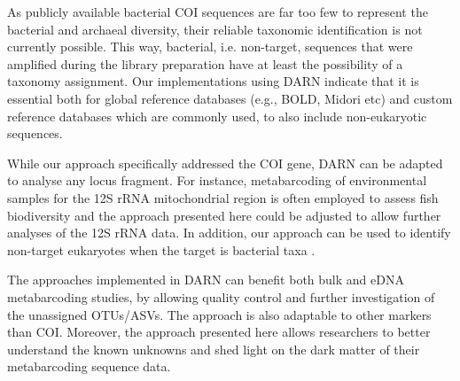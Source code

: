    As publicly available bacterial COI sequences are far too few to represent the bacterial and archaeal diversity, their reliable taxonomic identification is not currently possible. 
   This way, bacterial, i.e. non-target, sequences that were amplified during the library preparation have at least the possibility of a taxonomy assignment. 
   Our implementations using DARN indicate that it is essential both for global reference databases (e.g., BOLD, Midori etc) and custom reference databases which are commonly used, to also include non-eukaryotic sequences.

   While our approach specifically addressed the COI gene, DARN can be adapted to analyse any locus fragment. 
   For instance, metabarcoding of environmental samples for the 12S rRNA mitochondrial region is often employed to assess fish biodiversity \citep{weigand2019dna, miya2020mifish} and the approach presented here could be adjusted to allow further analyses of the 12S rRNA data. 
   In addition, our approach can be used to identify non-target eukaryotes when the target is bacterial taxa \citep{huys2008coamplification}.

   The approaches implemented in DARN can benefit both bulk and eDNA metabarcoding studies, by allowing quality control and further investigation of the unassigned OTUs/ASVs. 
   The approach is also adaptable to other markers than COI. Moreover, the approach presented here allows researchers to better understand the known unknowns and shed light on the dark matter of their metabarcoding sequence data.



